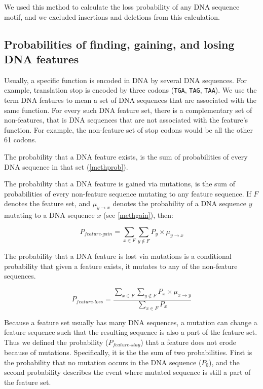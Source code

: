 \documentclass[12pt,a4paper]{article}
\begin{document}
We used this method to calculate the loss probability of any DNA sequence motif, and we excluded insertions and deletions from this calculation.

\subsection{Probabilities of finding, gaining, and losing DNA features}
\label{methfeatures}

Usually, a specific function is encoded in DNA by several DNA sequences. For example, translation stop is encoded by three codons (\texttt{TGA}, \texttt{TAG}, \texttt{TAA}). We use the term DNA features to mean a set of DNA sequences that are associated with the same function. For every such DNA feature set, there is a complementary set of non-features, that is DNA sequences that are not associated with the feature's function. For example, the non-feature set of stop codons would be all the other 61 codons. 

The probability that a DNA feature exists, is the sum of probabilities of every DNA sequence in that set (\autoref{methprob}).

The probability that a DNA feature is gained via mutations, is the sum of probabilities of every non-feature sequence mutating to any feature sequence. If $F$ denotes the feature set, and $\mu_{y\to x}$ denotes the probability of a DNA sequence $y$ mutating to a DNA sequence $x$ (see \autoref{methgain}), then:

\begin{equation}
P_\textit{feature-gain} = \sum_{x \in F} \sum_{y \notin F} P_y \times \mu_{y\to x}
\end{equation}

The probability that a DNA feature is lost via mutations is a conditional probability that given a feature exists, it mutates to any of the non-feature sequences. 

\begin{equation}
P_\textit{feature-loss} = \frac{\displaystyle\sum_{x \in F} \sum_{y \notin F} P_x \times \mu_{x\to y}}{\displaystyle\sum_{x \in F} P_x}
\end{equation}

Because a feature set usually has many DNA sequences, a mutation can change a feature sequence such that the resulting sequence is also a part of the feature set. Thus we defined the probability ($P_\textit{feature-stay}$) that a feature does not erode because of mutations. Specifically, it is the the sum of two probabilities. First is the probability that no mutation occurs in the DNA sequence ($P_0$), and the second probability describes the event where mutated sequence is still a part of the feature set.
\end{document}

